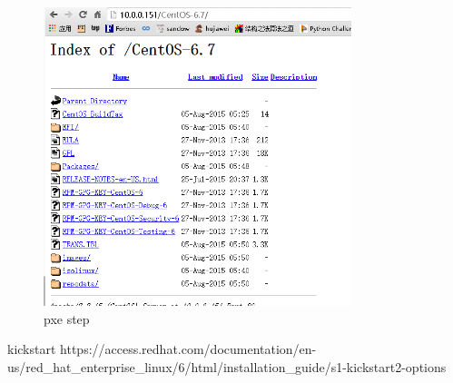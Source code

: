 \begin{figure}[!ht]
    \centering
     \caption{\label{Fig:kickstart-dhcp} pxe step}
    \includegraphics[width=0.8\textwidth]{./cobble/images/kickstart-dhcp.png}
\end{figure}

kickstart https://access.redhat.com/documentation/en-us/red_hat_enterprise_linux/6/html/installation_guide/s1-kickstart2-options
